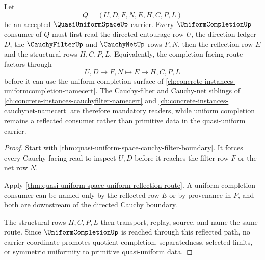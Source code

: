 \begin{theorem}
\label{thm:quasi-uniform-space-uniform-completion-sibling-route}
Let
$$
Q=(U,D,F,N,E,H,C,P,L)
$$
be an accepted $\QuasiUniformSpaceUp$ carrier. Every $\UniformCompletionUp$ consumer of $Q$ must first read the directed entourage row $U$, the direction ledger $D$, the $\CauchyFilterUp$ and $\CauchyNetUp$ rows $F,N$, then the reflection row $E$ and the structural rows $H,C,P,L$. Equivalently, the completion-facing route factors through
$$
U,D \longmapsto F,N \longmapsto E \longmapsto H,C,P,L
$$
before it can use the uniform-completion surface of \autoref{ch:concrete-instances-uniformcompletion-namecert}. The Cauchy-filter and Cauchy-net siblings of \autoref{ch:concrete-instances-cauchyfilter-namecert} and \autoref{ch:concrete-instances-cauchynet-namecert} are therefore mandatory readers, while uniform completion remains a reflected consumer rather than primitive data in the quasi-uniform carrier.
\end{theorem}
\begin{proof}
Start with \autoref{thm:quasi-uniform-space-cauchy-filter-boundary}. It forces every Cauchy-facing read to inspect $U,D$ before it reaches the filter row $F$ or the net row $N$.

Apply \autoref{thm:quasi-uniform-space-uniform-reflection-route}. A uniform-completion consumer can be named only by the reflected row $E$ or by provenance in $P$, and both are downstream of the directed Cauchy boundary.

The structural rows $H,C,P,L$ then transport, replay, source, and name the same route. Since $\UniformCompletionUp$ is reached through this reflected path, no carrier coordinate promotes quotient completion, separatedness, selected limits, or symmetric uniformity to primitive quasi-uniform data.
\end{proof}

